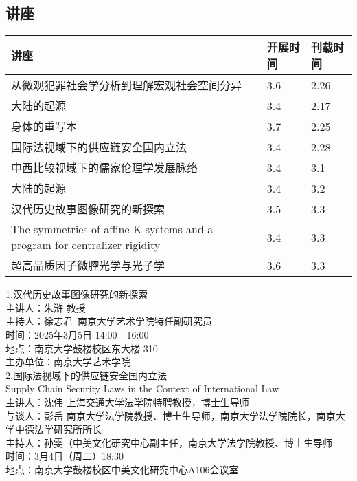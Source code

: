 \documentclass[letterpaper, 12pt]{article}
\begin{document}
\begin{multicols}{2}

\section{讲座}
\begin{tabular}{|>{\centering\arraybackslash}m{}|m{}|m{}|}
    \hline
    讲座 & 开展时间 & 刊载时间\\
    \hline\hline
    从微观犯罪社会学分析到理解宏观社会空间分异   &3.6  &2.26 \\\hline
    大陆的起源 & 3.4 & 2.17\\\hline
    身体的重写本 & 3.7 & 2.25\\\hline
    国际法视域下的供应链安全国内立法 & 3.4 & 2.28\\\hline
    中西比较视域下的儒家伦理学发展脉络 & 3.4 & 3.1\\\hline
    大陆的起源 & 3.4 & 3.2\\\hline
    汉代历史故事图像研究的新探索 & 3.5 & 3.3\\\hline
    The symmetries of affine K-systems and a program for centralizer rigidity & 3.4 & 3.3\\\hline
    超高品质因子微腔光学与光子学 & 3.6 & 3.3\\\hline
\end{tabular}
1.汉代历史故事图像研究的新探索\\
主讲人：朱浒 教授\\
主持人：徐志君 南京大学艺术学院特任副研究员\\
时间：2025年3月5日 14:00—16:00\\
地点：南京大学鼓楼校区东大楼 310\\
主办单位：南京大学艺术学院\\
    
2.国际法视域下的供应链安全国内立法\\
Supply Chain Security Laws in the Context of International Law\\
主讲人：沈伟 上海交通大学法学院特聘教授，博士生导师\\
与谈人：彭岳 南京大学法学院教授、博士生导师，南京大学法学院院长，南京大学中德法学研究所所长\\
主持人：孙雯（中美文化研究中心副主任，南京大学法学院教授、博士生导师\\
时间：3月4日（周二）18:30\\
地点：南京大学鼓楼校区中美文化研究中心A106会议室\\


\end{multicols}
\end{document}
